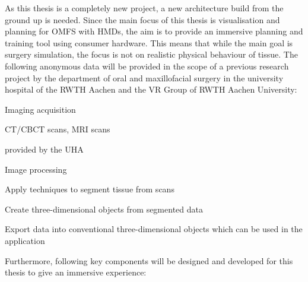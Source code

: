 As this thesis is a completely new project, a new architecture build from the ground up is needed.
Since the main focus of this thesis is visualisation and planning for OMFS with HMDs, the aim is to provide an immersive planning and training tool using consumer hardware.
This means that while the main goal is surgery simulation, the focus is not on realistic physical behaviour of tissue.
The following anonymous data will be provided in the scope of a previous research project by the department of oral and maxillofacial surgery in the university hospital of the RWTH Aachen and the VR Group of RWTH Aachen University:
\begin{compactenum}[label=(\alph*)]
    \item Imaging acquisition
    \begin{compactenum}[label=(\alph*)]
        \item CT/CBCT scans, MRI scans
        \item provided by the UHA
    \end{compactenum}
\item Image processing
    \begin{compactenum}[label=(\alph*)]
        \item Apply techniques to segment tissue from scans
        \item Create three-dimensional objects from segmented data
        \item Export data into conventional three-dimensional objects which can be used in the application
    \end{compactenum}
\end{compactenum}

Furthermore, following key components will be designed and developed for this thesis to give an immersive experience:

